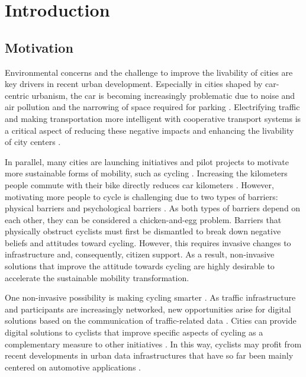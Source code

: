 \chapter{Introduction}\label{ch:introduction}

\section{Motivation}

Environmental concerns and the challenge to improve the livability of cities are key drivers in recent urban development. Especially in cities shaped by car-centric urbanism, the car is becoming increasingly problematic due to noise and air pollution and the narrowing of space required for parking \cite{gossling_why_2020}. Electrifying traffic and making transportation more intelligent with cooperative transport systems is a critical aspect of reducing these negative impacts and enhancing the livability of city centers \cite{seredynski_pathways_2023}. 

In parallel, many cities are launching initiatives and pilot projects to motivate more sustainable forms of mobility, such as cycling \cite{nieuwenhuijsen_car_2016, yang_tourists_2021}. Increasing the kilometers people commute with their bike directly reduces car kilometers \cite{hatfield_effect_2016}. However, motivating more people to cycle is challenging due to two types of barriers: physical barriers and psychological barriers \cite{nieuwenhuijsen_implementing_2019}. As both types of barriers depend on each other, they can be considered a chicken-and-egg problem. Barriers that physically obstruct cyclists must first be dismantled to break down negative beliefs and attitudes toward cycling. However, this requires invasive changes to infrastructure and, consequently, citizen support. As a result, non-invasive solutions that improve the attitude towards cycling are highly desirable to accelerate the sustainable mobility transformation. 

One non-invasive possibility is making cycling smarter \cite{nikolaeva_smart_2019}. As traffic infrastructure and participants are increasingly networked, new opportunities arise for digital solutions based on the communication of traffic-related data \cite{tran_factors_2023}. Cities can provide digital solutions to cyclists that improve specific aspects of cycling as a complementary measure to other initiatives \cite{oliveira_survey_2021}. In this way, cyclists may profit from recent developments in urban data infrastructures that have so far been mainly centered on automotive applications \cite{behrendt_cycling_2019}. 

